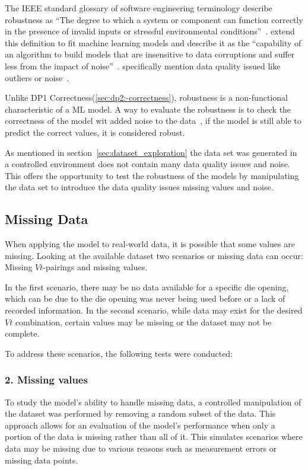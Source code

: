 The IEEE standard glossary of software engineering terminology describe robustness as ``The degree
to which a system or component can function correctly in the presence of invalid inputs or
stressful environmental conditions''~\cite[p. 64]{terminology1990ieee}.
\cite{saez2016evaluating} extend this definition to fit machine learning models and describe it
as the ``capability of an algorithm to build models that are insensitive to data corruptions and
suffer less from the impact of noise''~\cite[p. 2]{saez_evaluatingclassifierbehavior_2016}.
\cite{siebert2022construction} specifically mention data quality issued like outliers or
noise~\cite[p. 16]{siebert2022construction}.

Unlike DP1 Correctness(\ref{sec:dp2:-correctness}), robustness is a non-functional characteristic
of a \ac{ML} model.
A way to evaluate the robustness is to check the correctness of the model wit
added noise to the data~\cite[p. 18]{zhou_machinelearning_2021}, if the model is still able to
predict the correct values, it is considered robust.

As mentioned in section~\ref{sec:dataset_exploration} the data set
was generated in a controlled environment does not contain many data quality issues and noise.
This offers the opportunity to test the robustness of the models by manipulating the data set
to introduce the data quality issues missing values and noise.

\subsection{Missing Data}\label{subsec:missing-data}
When applying the model to real-world data, it is possible that some values are missing.
Looking at the available dataset two scenarios or missing data can occur: Missing $Vt$-pairings
and missing values.

In the first scenario, there may be no data available for a specific die
opening, which can be due to the die opening was never being used before or a lack of recorded
information.
In the second scenario, while data may exist for the desired $Vt$ combination, certain values may
be missing or the dataset may not be complete.


To address these scenarios, the following tests were conducted:

\subsubsection*{2. Missing values}
To study the model's ability to handle missing data, a controlled manipulation
of the dataset was performed by removing a random subset of the data.
This approach allows for an evaluation of the model's performance when only a portion of the data
is missing rather than all of it.
This simulates scenarios where data may be missing due to various reasons such as measurement
errors or missing data points.

